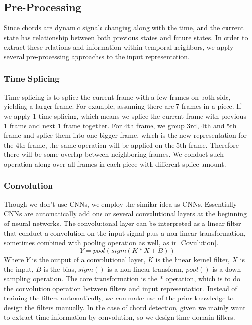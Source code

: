 \documentclass{article}
\begin{document}
\subsection{Pre-Processing}\label{sec:pre-proc}
Since chords are dynamic signals changing along with the time, and the current state has relationship between both previous states and future states. In order to extract these relations and information within temporal neighbors, we apply several pre-processing approaches to the input representation. 
\subsubsection{Time Splicing}
Time splicing is to splice the current frame with a few frames on both side, yielding a larger frame. For example, assuming there are 7 frames in a piece. If we apply 1 time splicing, which means we splice the current frame with previous 1 frame and next 1 frame together. For 4th frame, we group 3rd, 4th and 5th frame and splice them into one bigger frame, which is the new representation for the 4th frame, the same operation will be applied on the 5th frame. Therefore there will be some overlap between neighboring frames. We conduct such operation along over all frames in each piece with different splice amount. 


\subsubsection{Convolution}
Though we don't use CNNs, we employ the similar idea as CNNs. Essentially CNNs are automatically add one or several convolutional layers at the beginning of neural networks. The convolutional layer can be interpreted as a linear filter that conduct a convolution on the input signal plus a non-linear transformation, sometimes combined with pooling operation as well, as in \ref{Covulution}.
\begin{equation}\label{Covulution}
Y = pool(sigm(K \ast X + B))
\end{equation}  
Where $Y$ is the output of a convolutional layer, $K$ is the linear kernel filter, $X$ is the input, $B$ is the bias, $sigm()$ is a non-linear transform, $pool()$ is a down-sampling operation. The core transformation is the $\ast$ operation, which is to do the convolution operation between filters and input representation. 
Instead of training the filters automatically, we can make use of the prior knowledge to design the filters manually. In the case of chord detection, given we mainly want to extract time information by convolution, so we design time domain filters. 
\end{document}

